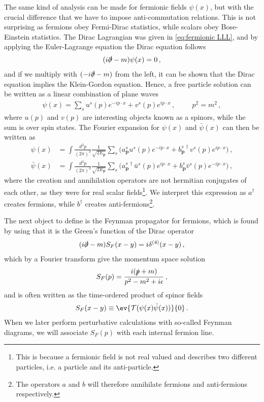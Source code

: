 \medskip
The same kind of analysis can be made for fermionic fields $\psi(x)$, but with the crucial difference that we have to impose anti-commutation relations. This is not surprising as fermions obey Fermi-Dirac statistics, while scalars obey Bose-Einstein statistics. The Dirac Lagrangian was given in \cref{eq:fermionic LLL}, and by applying the Euler-Lagrange equation the Dirac equation follows
\begin{align}
    (i\slashed{\partial}-m)\psi(x)=0\,,
\end{align}
and if we multiply with $(-i\slashed{\partial}-m)$ from the left, it can be shown that the Dirac equation implies the Klein-Gordon equation. Hence, a free particle solution can be written as a linear combination of plane waves
\begin{align}
    \psi(x)=\sum_{s}u^{s}(p)e^{-ip\cdot x}+v^{s}(p)e^{ip\cdot x}\,,\hspace{1cm}p^{2}=m^{2}\,,
\end{align}
where $u(p)$ and $v(p)$ are interesting objects known as a spinors, while the sum is over spin states. The Fourier expansion for $\psi(x)$ and $\bar{\psi}(x)$ can then be written as
\begin{align}
    \psi(x)&=\int\frac{d^{3}p}{(2\pi)^{3}}\frac{1}{\sqrt{2E_{\mathbf{p}}}}\sum_{s}\Big(a_{\mathbf{p}}^{s}u^{s}(p)e^{-ip\cdot x}+b_{\mathbf{p}}^{s\,\dagger}v^{s}(p)e^{ip\cdot x}\Big)\,,
    \\
    \bar{\psi}(x)&=\int\frac{d^{3}p}{(2\pi)^{3}}\frac{1}{\sqrt{2E_{\mathbf{p}}}}\sum_{s}\Big(a_{\mathbf{p}}^{s\,\dagger}\bar{u}^{s}(p)e^{ip\cdot x}+b_{\mathbf{p}}^{s}\bar{v}^{s}(p)e^{-ip\cdot x}\Big)\,,
\end{align}
where the creation and annihilation operators are not hermitian conjugates of each other, as they were for real scalar fields\footnote{This is because a fermionic field is not real valued and describes two different particles, i.e. a particle and its anti-particle.}. We interpret this expression as $a^{\dagger}$ creates fermions, while $b^{\dagger}$ creates anti-fermions\footnote{The operators $a$ and $b$ will therefore annihilate fermions and anti-fermions respectively.}. 

The next object to define is the Feynman propagator for fermions, which is found by using that it is the Green's function of the Dirac operator
\begin{align}
    (i\slashed{\partial}-m)S_{F}(x-y)=i\delta^{(4)}(x-y)\,,
\end{align}
which by a Fourier transform give the momentum space solution
\begin{align}\label{eq:canocical fermion propagator}
    S_{F}(p)=\frac{i(\slashed{p}+m)}{p^{2}-m^{2}+i\epsilon}\,,
\end{align}
and is often written as the time-ordered product of spinor fields
\begin{align}
    S_{F}(x-y)\equiv\ev{\mathcal{T}(\psi(x)\bar{\psi}(x))}{0}\,.
\end{align}
When we later perform perturbative calculations with so-called Feynman diagrams, we will associate $S_{F}(p)$ with each internal fermion line. 


